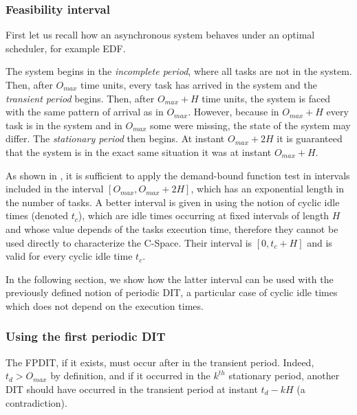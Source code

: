 \documentclass[conference]{IEEEtran}
\begin{document}
		\subsubsection{Feasibility interval}
			First let us recall how an asynchronous system behaves under an optimal
			scheduler, for example EDF.

			The system begins in the
			\emph{incomplete period}, where all tasks are not in the system. Then, after
			$O_{max}$ time units, every task has arrived in the system and the \emph{transient
			period} begins. Then, after $O_{max} + H$ time units, the system is faced
			with the same pattern of arrival as in $O_{max}$. However, because in
			$O_{max} + H$ every task is in the system and in $O_{max}$ some were missing,
			the state of the system may differ. The \emph{stationary period} then
			begins. At instant $O_{max} + 2H$ it is guaranteed that the system is in the
			exact same situation it was at instant $O_{max} + H$.

			As shown in \cite{leung1982complexity}, it is sufficient to
            apply the demand-bound function test in
			intervals included in the interval $[O_{max}, O_{max} + 2H]$, which has an exponential length
			in the number of tasks. A better interval is given in \cite{choquet2004minimal} using the
			notion of cyclic idle times (denoted $t_c$), which are idle times occurring at fixed intervals of
            length $H$ and whose value depends of the tasks execution
			time, therefore they cannot be used directly to characterize the C-Space. Their interval is
            $[0, t_c + H]$ and is valid for every cyclic idle time $t_c$.

			In the following section, we show how the latter interval can be used with the previously defined
            notion of periodic DIT, a particular case of cyclic idle times which does not depend on the execution
			times.

\subsubsection{Using the first periodic DIT}

The FPDIT, if it exists, must occur after in the transient period. Indeed, $t_d > O_{max}$ by definition, and if it occurred in the $k^{th}$ stationary period, another DIT should have occurred in the transient period at instant $t_d - k H$ (a contradiction).
\end{document}

